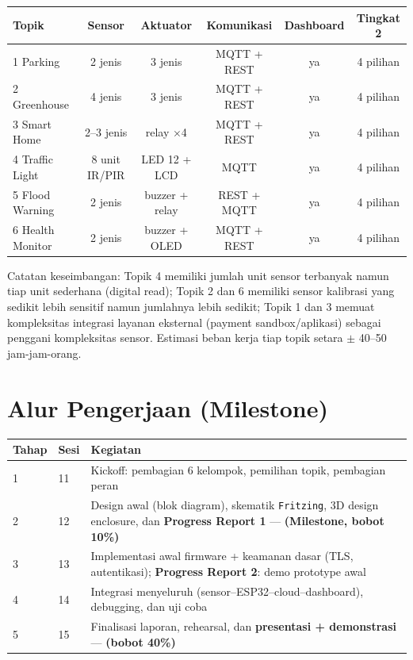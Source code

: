 \documentclass[11pt,a4paper]{article}
\begin{document}
\begin{center}
\small
\begin{tabular}{@{}lccccc@{}}
\toprule
\textbf{Topik} & \textbf{Sensor} & \textbf{Aktuator} & \textbf{Komunikasi} &
\textbf{Dashboard} & \textbf{Tingkat 2} \\
\midrule
1 Parking        & 2 jenis & 3 jenis & MQTT + REST & ya & 4 pilihan \\
2 Greenhouse     & 4 jenis & 3 jenis & MQTT + REST & ya & 4 pilihan \\
3 Smart Home     & 2--3 jenis & relay $\times$4 & MQTT + REST & ya & 4 pilihan \\
4 Traffic Light  & 8 unit IR/PIR & LED 12 + LCD & MQTT & ya & 4 pilihan \\
5 Flood Warning  & 2 jenis & buzzer + relay & REST + MQTT & ya & 4 pilihan \\
6 Health Monitor & 2 jenis & buzzer + OLED & MQTT + REST & ya & 4 pilihan \\
\bottomrule
\end{tabular}
\end{center}

Catatan keseimbangan: Topik 4 memiliki jumlah unit sensor terbanyak namun
tiap unit sederhana (digital read); Topik 2 dan 6 memiliki sensor kalibrasi
yang sedikit lebih sensitif namun jumlahnya lebih sedikit; Topik 1 dan 3
memuat kompleksitas integrasi layanan eksternal (payment sandbox/aplikasi)
sebagai penggani kompleksitas sensor. Estimasi beban kerja tiap topik
setara $\pm$ 40--50 jam-jam-orang.

\section{Alur Pengerjaan (Milestone)}

\begin{center}
\small
\setlength{\tabcolsep}{4pt}
\begin{tabular}{@{}p{1.1cm}p{2.0cm}p{11.2cm}@{}}
\toprule
\textbf{Tahap} & \textbf{Sesi} & \textbf{Kegiatan} \\
\midrule
1 & 11 & Kickoff: pembagian 6 kelompok, pemilihan topik, pembagian peran \\
2 & 12 & Design awal (blok diagram), skematik \texttt{Fritzing}, 3D design
       enclosure, dan \textbf{Progress Report 1} --- \textbf{(Milestone,
       bobot 10\%)} \\
3 & 13 & Implementasi awal firmware + keamanan dasar (TLS, autentikasi);
       \textbf{Progress Report 2}: demo prototype awal \\
4 & 14 & Integrasi menyeluruh (sensor--ESP32--cloud--dashboard), debugging,
       dan uji coba \\
5 & 15 & Finalisasi laporan, rehearsal, dan \textbf{presentasi +
       demonstrasi} --- \textbf{(bobot 40\%)} \\
\bottomrule
\end{tabular}
\end{center}
\end{document}

